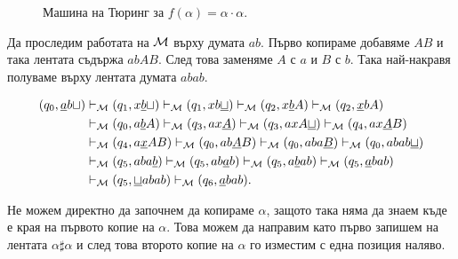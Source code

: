 \begin{example}
\begin{framed}
\begin{figure}[H]
\begin{center}
      \caption{Машина на Тюринг за $f(\alpha) = \alpha\cdot \alpha$.}
    \end{center}
  \end{figure}
\end{framed}

Да проследим работата на $\mathcal{M}$ върху думата $ab$.
Първо копираме добавяме $AB$ и така лентата съдържа $abAB$. 
След това заменяме $A$ с $a$ и $B$ с $b$. Така най-накравя полуваме върху лентата думата $abab$.

\begin{align*}
  (q_0, \underline{a}b\sqcup) & \vdash_{\mathcal{M}} (q_1, x\underline{b}\sqcup) \vdash_{\mathcal{M}} (q_1,xb\underline{\sqcup}) \vdash_{\mathcal{M}} (q_2, x\underline{b}A) \vdash_{\mathcal{M}} (q_2, \underline{x}bA)\\
                        & \vdash_{\mathcal{M}} (q_0, a\underline{b}A) \vdash_{\mathcal{M}} (q_3, ax\underline{A}) \vdash_{\mathcal{M}} (q_3, axA\underline{\sqcup}) \vdash_{\mathcal{M}} (q_4, ax\underline{A}B)\\
                        & \vdash_{\mathcal{M}} (q_4, a\underline{x}AB) \vdash_{\mathcal{M}} (q_0, ab\underline{A}B) \vdash_{\mathcal{M}} (q_0,aba\underline{B}) \vdash_{\mathcal{M}} (q_0, abab\underline{\sqcup})\\
                        & \vdash_{\mathcal{M}} (q_5, aba\underline{b}) \vdash_{\mathcal{M}} (q_5, ab\underline{a}b) \vdash_{\mathcal{M}} (q_5, a\underline{b}ab) \vdash_{\mathcal{M}} (q_5, \underline{a}bab)\\
                        & \vdash_{\mathcal{M}} (q_5, \underline{\sqcup}abab) \vdash_{\mathcal{M}} (q_6, \underline{a}bab).
\end{align*}

Не можем директно да започнем да копираме $\alpha$, защото така няма да знаем къде е края на първото копие на $\alpha$.
Това можем да направим като първо запишем на лентата $\alpha \sharp \alpha$ и след това второто копие на $\alpha$ го изместим с една позиция наляво.
\end{example}

